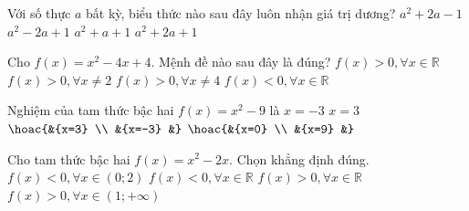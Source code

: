 \begin{ex}%
	Với số thực $a$ bất kỳ, biểu thức nào sau đây luôn nhận giá trị dương?
	\choice
	{$a^2+2a-1$}
	{$a^2-2a+1$}
	{\True $a^2+a+1$}
	{$a^2+2a+1$}
\end{ex}

\begin{ex}%
	Cho $f(x)=x^2-4x+4$. Mệnh đề nào sau đây là đúng?
	\choice
	{$f(x) > 0,\forall x\in \mathbb{R}$}
	{\True $f(x) > 0,\forall x\ne 2$}
	{$f(x) > 0,\forall x\ne 4$}
	{$f(x) < 0,\forall x\in \mathbb{R}$}
\end{ex}

\begin{ex}%
	Nghiệm của tam thức bậc hai $f(x)=x^2-9$ là
	\choice
	{$x=-3$}
	{$x=3$}
	{\True $\hoac{&{x=3} \\
			&{x=-3}
			&}$}
	{$\hoac{&{x=0} \\
			&{x=9}
			&}$}
\end{ex}

\begin{ex}%
	Cho tam thức bậc hai $f(x)=x^2-2x$. Chọn khẳng định đúng.
	\choice
	{\True $f(x) < 0,\forall x\in \left(0;2\right)$}
	{$f(x) < 0,\forall x\in \mathbb{R}$}
	{$f(x) > 0,\forall x\in \mathbb{R}$}
	{$f(x) > 0,\forall x\in \left(1;+\infty \right)$}
\end{ex}

